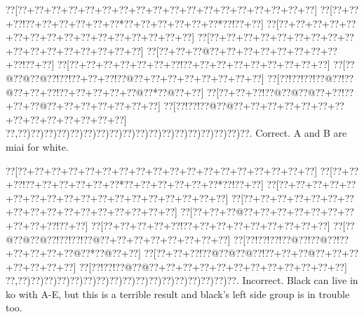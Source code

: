 \documentclass[a5paper]{article}
\begin{document}
\begin{center}
{\goo
\0??[\0??+\0??+\0??+\0??+\0??+\0??+\0??+\0??+\0??+\0??+\0??+\0??+\0??+\0??+\0??+\0??+\0??+\0??]
\0??[\0??+\0??+\0??!\0??+\0??+\0??+\0??+\0??+\0??*\0??+\0??+\0??+\0??+\0??+\0??*\0??!\0??+\0??]
\0??[\0??+\0??+\0??+\0??+\0??+\0??+\0??+\0??+\0??+\0??+\0??+\0??+\0??+\0??+\0??+\0??]
\0??[\0??+\0??+\0??+\0??+\0??+\0??+\0??+\0??+\0??+\0??+\0??+\0??+\0??+\0??+\0??+\0??+\0??]
\0??[\0??+\0??+\0??@\0??+\0??+\0??+\0??+\0??+\0??+\0??+\0??+\0??!\0??+\0??]
\0??[\0??+\0??+\0??+\0??+\0??+\0??+\0??!\0??+\0??+\0??+\0??+\0??+\0??+\0??+\0??+\0??]
\0??[\0??@\0??@\0??@\0??!\0??!\0??+\0??+\0??!\0??@\0??+\0??+\0??+\0??+\0??+\0??+\0??+\0??]
\0??[\0??!\0??!\0??!\0??@\0??!\0??@\0??+\0??+\0??!\0??+\0??+\0??+\0??+\0??@\0??*\0??@\0??+\0??]
\0??[\0??+\0??+\0??!\0??@\0??@\0??@\0??+\0??!\0??+\0??+\0??@\0??+\0??+\0??+\0??+\0??+\0??+\0??]
\0??[\0??!\0??!\0??@\0??@\0??+\0??+\0??+\0??+\0??+\0??+\0??+\0??+\0??+\0??+\0??+\0??+\0??+\0??]
\0??,\0??)\0??)\0??)\0??)\0??)\0??)\0??)\0??)\0??)\0??)\0??)\0??)\0??)\0??)\0??)\0??)\0??)\0??.
}
Correct. A and B are miai for white.

\end{center}
\begin{center}
{\goo
\0??[\0??+\0??+\0??+\0??+\0??+\0??+\0??+\0??+\0??+\0??+\0??+\0??+\0??+\0??+\0??+\0??+\0??+\0??]
\0??[\0??+\0??+\0??!\0??+\0??+\0??+\0??+\0??+\0??*\0??+\0??+\0??+\0??+\0??+\0??*\0??!\0??+\0??]
\0??[\0??+\0??+\0??+\0??+\0??+\0??+\0??+\0??+\0??+\0??+\0??+\0??+\0??+\0??+\0??+\0??+\0??+\0??]
\0??[\0??+\0??+\0??+\0??+\0??+\0??+\0??+\0??+\0??+\0??+\0??+\0??+\0??+\0??+\0??+\0??+\0??]
\0??[\0??+\0??+\0??@\0??+\0??+\0??+\0??+\0??+\0??+\0??+\0??+\0??+\0??!\0??+\0??]
\0??[\0??+\0??+\0??+\0??+\0??!\0??+\0??+\0??+\0??+\0??+\0??+\0??+\0??+\0??]
\0??[\0??@\0??@\0??@\0??!\0??!\0??!\0??@\0??+\0??+\0??+\0??+\0??+\0??+\0??+\0??]
\0??[\0??!\0??!\0??!\0??@\0??!\0??@\0??!\0??+\0??+\0??+\0??+\0??@\0??*\0??@\0??+\0??]
\0??[\0??+\0??+\0??!\0??@\0??@\0??@\0??!\0??+\0??+\0??@\0??+\0??+\0??+\0??+\0??+\0??+\0??]
\0??[\0??!\0??!\0??@\0??@\0??+\0??+\0??+\0??+\0??+\0??+\0??+\0??+\0??+\0??+\0??+\0??]
\0??,\0??)\0??)\0??)\0??)\0??)\0??)\0??)\0??)\0??)\0??)\0??)\0??)\0??)\0??)\0??)\0??)\0??.
}
Incorrect. Black can live in ko with A-E, but this is a terrible result and black's left side group is in trouble too.

\end{center}
\end{document}
